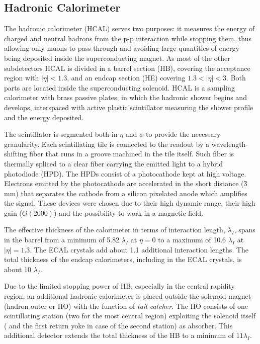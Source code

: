 \subsection{Hadronic Calorimeter}

The hadronic calorimeter (HCAL) serves two purposes: it measures the energy of charged and neutral hadrons from the p-p interaction while stopping them, thus allowing only muons to pass through and avoiding large quantities of energy being deposited inside the superconducting magnet. As most of the other subdetectors HCAL is divided in a barrel section (HB), covering the acceptance region with $|\eta| < 1.3$, and an endcap section (HE) covering $1.3 < |\eta| < 3$. Both parts are located inside the superconducting solenoid. HCAL is a sampling calorimeter with brass passive plates, in which the hadronic shower begins and develops, interspaced with active plastic scintillator measuring the shower profile and the energy deposited. 

The scintillator is segmented both in $\eta$ and $\phi$ to provide the necessary granularity. Each scintillating tile is connected to the readout by a wavelength-shifting fiber that runs in a groove machined in the tile itself. Such fiber is thermally spliced to a clear fiber carrying the emitted light to a hybrid photodiode (HPD). The HPDs consist of a photocathode kept at high voltage. Electrons emitted by the photocathode are accelerated in the short distance (\~3 mm) that separates the cathode from a silicon pixelated anode which amplifies the signal. These devices were chosen due to their high dynamic range, their high gain ($O(2000)$) and the possibility to work in a magnetic field.

The effective thickness of the calorimeter in terms of interaction length, $\lambda_I$, spans in the barrel from a minimum of 5.82 $\lambda_I$ at $\eta=0$ to a maximum of 10.6 $\lambda_I$ at $|\eta| = 1.3$. The ECAL crystals add about 1.1 additional interaction lengths. The total thickness of the endcap calorimeters, including in the ECAL crystals, is about 10 $\lambda_I$.

Due to the limited stopping power of HB, especially in the central rapidity region, an additional hadronic calorimeter is placed outside the solenoid magnet (hadron outer or HO) with the function of \emph{tail catcher}. The HO consists of one scintillating station (two for the most central region) exploiting the solenoid itself ( and the first return yoke in case of the second station) as absorber. This additional detector extends the total thickness of the HB to a minimum of $11 \lambda_I$.

